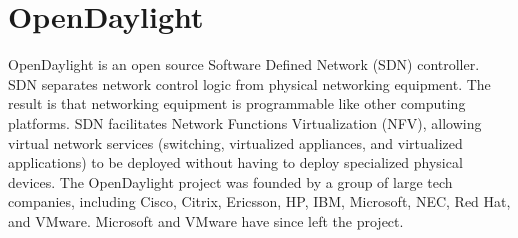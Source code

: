 \section{OpenDaylight}

OpenDaylight is an open source Software Defined Network
(SDN) controller\cite{hid-sp18-419-www-opendaylight}. SDN
separates network control logic from physical networking
equipment. The result is that networking equipment is programmable
like other computing platforms. SDN facilitates Network Functions
Virtualization (NFV), allowing virtual network services
(switching, virtualized appliances, and virtualized applications) to
be deployed without having to deploy specialized physical
devices\cite{hid-sp18-419-www-cio-sdn-nfv}. The OpenDaylight project
was founded by a group of large tech companies, including
Cisco, Citrix, Ericsson,
HP, IBM, Microsoft,
NEC, Red Hat, and
VMware. Microsoft and VMware have since left the
project\cite{hid-sp18-419-www-sdx-odl}.
